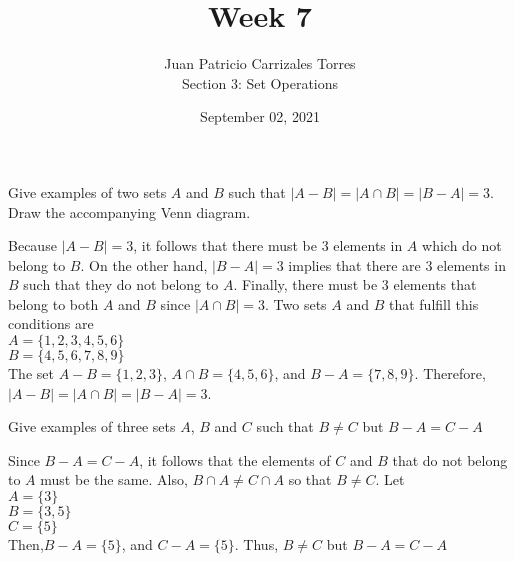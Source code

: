 \documentclass[12pt]{article}
\newenvironment{problem}[2][Problem]{\begin{trivlist}
		\item[\hskip \labelsep {\bfseries #1}\hskip \labelsep {\bfseries #2.}]}{\end{trivlist}}
\newenvironment{solution}[2][Solution]{\begin{trivlist}
		\item[\hskip \labelsep {\bfseries #1}\hskip \labelsep {\bfseries #2.}]}{\end{trivlist}}
\begin{document}
	
	\title{Week 7}
	\author{Juan Patricio Carrizales Torres \\
		Section 3: Set Operations}
	\date{September 02, 2021}
	\maketitle
	
	\begin{problem}{23}
		Give examples of two sets $A$ and $B$ such that $|A-B|=|A\cap B|=|B-A|=3$. Draw the accompanying Venn diagram.
		\begin{solution}{} 
			Because $|A-B|=3$, it follows that there must be 3 elements in $A$ which do not belong to $B$. On the other hand, $|B-A|=3$ implies that there are 3 elements in $B$ such that they do not belong to $A$. Finally, there must be 3 elements that belong to both $A$ and $B$ since $|A\cap B|=3$.
			Two sets $A$ and $B$ that fulfill this conditions are\\
			$A=\{1,2,3,4,5,6\}$\\
			$B=\{4,5,6,7,8,9\}$\\
			The set $A-B=\{1,2,3\}$, 
			$A\cap B= \{4,5,6\}$, and 
			$B-A= \{7,8,9\}$.
			Therefore, $|A-B|=|A\cap B|=|B-A|=3$.
			\begin{center}
			\end{center}
		\end{solution}
	\end{problem}
	
	\begin{problem}{24}
		Give examples of three sets $A$, $B$ and $C$ such that $B \neq C$ but $B-A=C-A$
		\begin{solution}{}
			Since $B-A=C-A$, it follows that the elements of $C$ and $B$ that do not belong to $A$ must be the same. Also, $B\cap A \neq C\cap A$ so that $B\neq C$. 
			Let \\ $A=\{3\}$\\ $B=\{3,5\}$\\$C=\{5\}$\\
			Then,$B-A=\{5\}$, and $C-A=\{5\}$. Thus, $B\neq C$ but $B-A=C-A$ 
		\end{solution}
	\end{problem}
\end{document}
